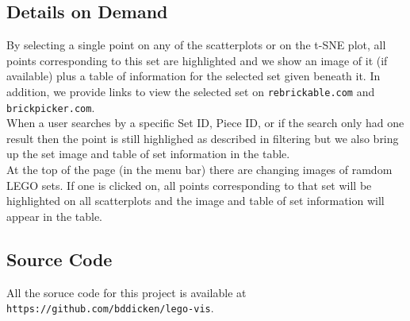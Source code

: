 \documentclass[a4paper, 12pt]{article}
\begin{document}
\subsection*{Details on Demand}

By selecting a single point on any of the scatterplots or on the t-SNE plot, all points corresponding to this set are highlighted and we show an image of it (if available) plus a table of information for the selected set given beneath it. In addition, we provide links to view the selected set on \texttt{rebrickable.com} and \texttt{brickpicker.com}. \\

When a user searches by a specific Set ID, Piece ID, or if the search only had one result then the point is still highlighed as described in filtering but we also bring up the set image and table of set information in the table. \\

At the top of the page (in the menu bar) there are changing images of ramdom LEGO sets. If one is clicked on, all points corresponding to that set will be highlighted on all scatterplots and the image and table of set information will appear in the table. \\

\subsection*{Source Code}

All the soruce code for this project is available at \texttt{https://github.com/bddicken/lego-vis}.
\end{document}
